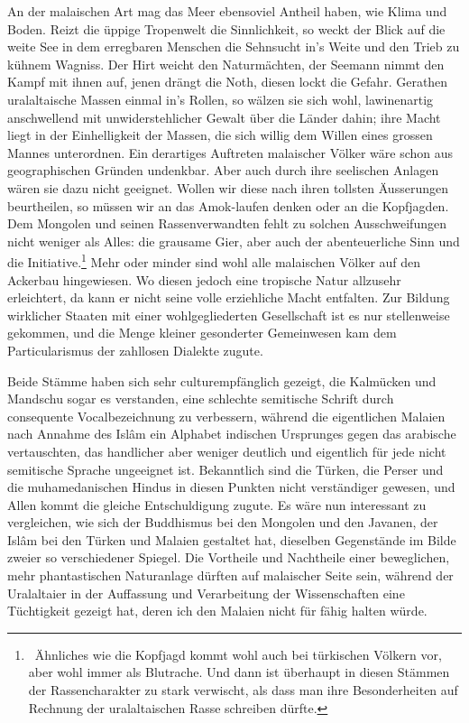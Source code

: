 An der malaischen Art mag das Meer ebensoviel Antheil haben, wie Klima und Boden. Reizt die üppige Tropenwelt die Sinnlichkeit, so weckt der Blick auf die weite See in dem erregbaren Menschen die Sehnsucht in’s Weite und den Trieb zu kühnem Wagniss. Der Hirt weicht den Naturmächten, der Seemann nimmt den Kampf mit ihnen auf, jenen drängt die Noth, diesen lockt die Gefahr. Gerathen uralaltaische Massen einmal in’s Rollen, so wälzen sie sich wohl, lawinenartig anschwellend mit unwiderstehlicher Gewalt über die Länder dahin; ihre Macht liegt in der Einhelligkeit der Massen, die sich willig dem Willen eines grossen Mannes unterordnen. Ein derartiges Auftreten malaischer Völker wäre schon aus geographischen Gründen undenkbar. Aber auch durch ihre seelischen Anlagen wären sie dazu nicht geeignet. Wollen wir diese nach ihren tollsten Äusserungen beurtheilen, so müssen wir an das Amok-laufen denken oder an die Kopfjagden. Dem Mongolen und seinen Rassenverwandten fehlt zu solchen Ausschweifungen nicht weniger \label{fp.396} als Alles: die grausame Gier, aber auch der abenteuerliche Sinn und die Initiative.\footnote{\ Ähnliches wie die Kopfjagd kommt wohl auch bei türkischen Völkern vor, aber wohl immer als Blutrache. Und dann ist überhaupt in diesen Stämmen der Rassencharakter zu stark verwischt, als dass man ihre Besonderheiten auf Rechnung der uralaltaischen Rasse schreiben dürfte.} Mehr oder minder sind wohl alle malaischen Völker auf den Ackerbau hingewiesen. Wo diesen jedoch eine tropische Natur allzusehr erleichtert, da kann er nicht seine volle erziehliche Macht entfalten. Zur Bildung wirklicher Staaten mit einer wohlgegliederten Gesellschaft ist es nur stellenweise gekommen, und die Menge kleiner gesonderter Gemeinwesen kam dem Particularismus der zahllosen Dialekte zugute.

Beide Stämme haben sich sehr culturempfänglich gezeigt, die Kalmücken und Mandschu sogar es verstanden, eine schlechte semitische Schrift durch consequente Vocalbezeichnung zu verbessern, während die eigentlichen Malaien nach Annahme des Islâm ein Alphabet indischen Ursprunges gegen das arabische vertauschten, das handlicher aber weniger deutlich und eigentlich für jede nicht semitische Sprache ungeeignet ist. Bekanntlich sind die Türken, die Perser und die muhamedanischen Hindus in diesen Punkten nicht verständiger gewesen, und Allen kommt die gleiche Entschuldigung zugute. Es wäre nun interessant \label{sp.418} zu vergleichen, wie sich der Buddhismus bei den Mongolen und den Javanen, der Islâm bei den Türken und Malaien gestaltet hat, dieselben Gegenstände im Bilde zweier so verschiedener Spiegel. Die Vortheile und Nachtheile einer beweglichen, mehr phantastischen Naturanlage dürften auf malaischer Seite sein, während der Uralaltaier in der Auffassung und Verarbeitung der Wissenschaften eine Tüchtigkeit gezeigt hat, deren ich den Malaien nicht für fähig halten würde.

